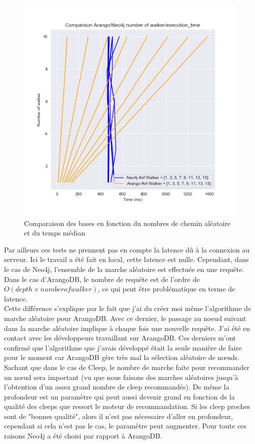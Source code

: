 \documentclass{article} %
\begin{document}
\begin{figure}[!h]
	\centering
	\includegraphics[keepaspectratio = true,scale=0.7]{comparison_nbWalker_time.png}
	\caption{Comparaison des bases en fonction du nombres de chemin aléatoire et du temps médian}
	\label{fig:walker}
\end{figure}

Par ailleurs ces tests ne prennent pas en compte la latence dû à la connexion au serveur. Ici le travail a été fait en local, cette latence est nulle. Cependant, dans le cas de Neo4j, l’ensemble de la marche aléatoire est effectuée en une requête. Dans le cas d’ArangoDB, le nombre de requête est de l’ordre de $O(depth\times number of walker)$, ce qui peut être problématique en terme de latence.\\
Cette différence s'explique par le fait que j'ai du créer moi même l'algorithme de marche aléatoire pour ArangoDB. Avec ce dernier, le passage au noeud suivant dans la marche aléatoire implique à chaque fois une nouvelle requête.  J'ai été en contact avec les développeurs travaillant sur ArangoDB. Ces derniers m'ont confirmé que l'algorithme que j'avais développé était la seule manière de faire pour le moment car ArangoDB gère très mal la sélection aléatoire de nœuds.\\

Sachant que dans le cas de Cleep, le nombre de marche faite pour recommander un nœud sera important (vu que nous faisons des marches aléatoires jusqu'à l'obtention d'un assez grand nombre de cleep recommandés). De même la profondeur est un paramètre qui peut aussi devenir grand en fonction de la qualité des cleeps que ressort le moteur de recommandation. Si les cleep proches sont de "bonnes qualité", alors il n'est pas nécessaire d'aller en profondeur, cependant si cela n'est pas le cas, le paramètre peut augmenter. Pour toute ces raisons Neo4j a été choisi par rapport à ArangoDB.
\end{document}
